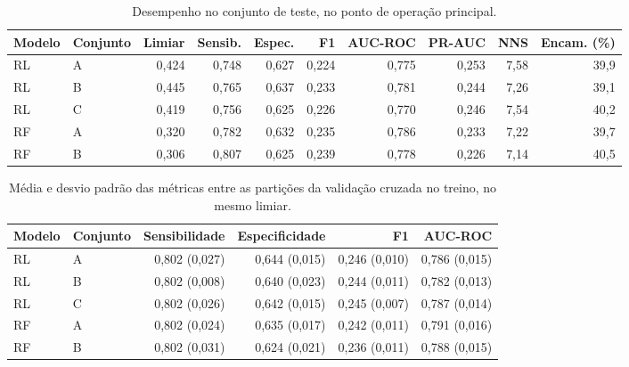 \begin{table}[htb]
  \centering
  \caption{\label{tab:desempenho-teste}Desempenho no conjunto de teste, no ponto de operação principal.}
  \footnotesize
  \setlength{\tabcolsep}{4pt}
  \begin{tabular}{llrrrrrrrr}
    \hline
    Modelo & Conjunto & Limiar & Sensib. & Espec. & F1 & AUC-ROC & PR-AUC & NNS & Encam. (\%) \\ \hline
    RL & A & 0,424 & 0,748 & 0,627 & 0,224 & 0,775 & 0,253 & 7,58 & 39,9 \\
    RL & B & 0,445 & 0,765 & 0,637 & 0,233 & 0,781 & 0,244 & 7,26 & 39,1 \\
    RL & C & 0,419 & 0,756 & 0,625 & 0,226 & 0,770 & 0,246 & 7,54 & 40,2 \\
    RF & A & 0,320 & 0,782 & 0,632 & 0,235 & 0,786 & 0,233 & 7,22 & 39,7 \\
    RF & B & 0,306 & 0,807 & 0,625 & 0,239 & 0,778 & 0,226 & 7,14 & 40,5 \\ \hline
  \end{tabular}
\end{table}

\begin{table}[htb]
  \centering
  \caption{\label{tab:desempenho-cv}Média e desvio padrão das métricas entre as partições da validação cruzada no treino, no mesmo limiar.}
  \small
  \begin{tabular}{llrrrr}
    \hline
    Modelo & Conjunto & Sensibilidade & Especificidade & F1 & AUC-ROC \\ \hline
    RL & A & 0,802 (0,027) & 0,644 (0,015) & 0,246 (0,010) & 0,786 (0,015) \\
    RL & B & 0,802 (0,008) & 0,640 (0,023) & 0,244 (0,011) & 0,782 (0,013) \\
    RL & C & 0,802 (0,026) & 0,642 (0,015) & 0,245 (0,007) & 0,787 (0,014) \\
    RF & A & 0,802 (0,024) & 0,635 (0,017) & 0,242 (0,011) & 0,791 (0,016) \\
    RF & B & 0,802 (0,031) & 0,624 (0,021) & 0,236 (0,011) & 0,788 (0,015) \\ \hline
  \end{tabular}
\end{table}

